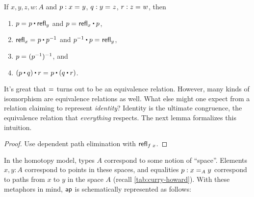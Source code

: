 \documentclass[./thesis.tex]{subfiles}
\begin{document}
\begin{lemma}
  If $x,y,z,w:A$ and $p:\propeq{}{x}{y}$, $q:\propeq{}{y}{z}$, $r:\propeq{}{z}{w}$,
  then
  \begin{enumerate}[label=\alph*)]
    \itemsep0em
    \item $\propeq{}{p}{p\ct\refl{y}}$ and $\propeq{}{p}{\refl{x}\ct p}$,
    \item $\propeq{}{\refl{x}}{p\ct p^{-1}}$ and $\propeq{}{p^{-1}\ct p}{\refl{y}}$,
    \item $\propeq{}{p}{(p^{-1})^{-1}}$, and
    \item $\propeq{}{(p\ct q)\ct r}{p \ct (q\ct r)}$.
  \end{enumerate}
\end{lemma}

It's great that $\propeqsign$ turns out to be an equivalence relation. However,
many kinds of isomorphism are equivalence relations as well. What else might one
expect from a relation claiming to represent \textit{identity}? Identity is
the ultimate congruence, the equivalence relation that \textit{everything}
respects. The next lemma formalizes this intuition.

\begin{proof}
	Use dependent path elimination with $\refl{\apply{f}{x}}$.
\end{proof}

In the homotopy model, types $A$ correspond to some notion of ``space''. 
Elements $x,y:A$ correspond to points in these spaces, and equalities
$p:\propeq{A}{x}{y}$ correspond to paths from $x$ to $y$ in the space $A$
(recall \cref{tab:curry-howard}). With these metaphors in mind, $\ap$ is
schematically represented as follows:
\end{document}
